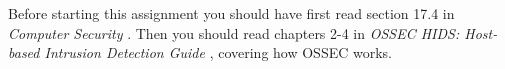 Before starting this assignment you should have first read section 17.4 in 
\emph{Computer Security} \cite{Gollmann2011cs}.
Then you should read chapters 2-4 in \emph{OSSEC HIDS: Host-based Intrusion 
Detection Guide} \cite{ossec2,ossec3,ossec4}, covering how OSSEC works.
